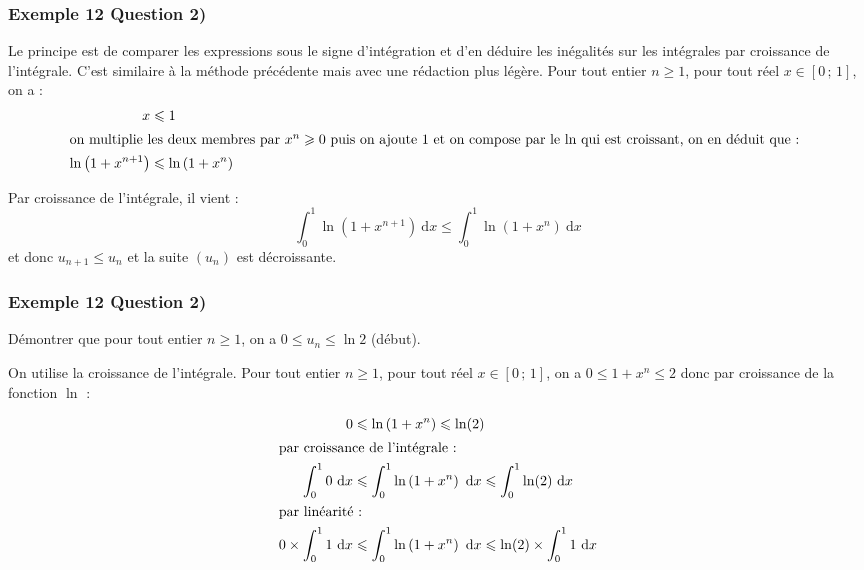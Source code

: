\documentclass[11pt, hyperref={urlcolor=red,%
            linkcolor=blue, %
            colorlinks=true}]{beamer}
\newcommand{\Interff}[2]{\left[#1\, ;\, #2\right]}
\newcommand{\suite}[1]{\ensuremath{\left(#1_{n}\right)}}
\newcommand{\dx}{\ensuremath{\text{d}x}}		%
\newcommand{\integralex}[3]{\int_{#1}^{#2} #3 \ \dx}
\begin{document}
\begin{frame}
\frametitle{Exemple  12 Question 2)}

Le principe est de comparer les expressions sous le signe d'intégration et d'en déduire les inégalités sur les intégrales par croissance de l'intégrale. C'est similaire à la méthode précédente mais avec une rédaction plus légère. Pour tout entier $n \geqslant 1$, pour tout réel $x \in \Interff{0}{1}$,  on a :
\pause \begin{align*}
x & \leqslant 1 \\
\intertext{on multiplie les deux membres par $x^{n}  \geqslant 0$ puis   on ajoute $1$ et on compose par le $\ln$ qui est croissant, on en déduit que :
}
\ln\left(1+x^{n+1}\right) &\leqslant \ln\left(1+x^{n}\right)
\end{align*}

Par croissance de l'intégrale, il vient :
$$\integralex{0}{1}{\ln\left(1+x^{n+1}\right)} \leqslant \integralex{0}{1}{\ln\left(1+x^{n}\right)}$$
et donc $u_{n+1}  \leqslant u_{n}$  et  la suite $\suite{u}$ est décroissante.




\end{frame}





\begin{frame}
\frametitle{Exemple  12 Question 2)}
Démontrer que pour tout entier $n \geqslant 1$, on a $0 \leqslant u_{n} \leqslant \ln 2$ (début).

On utilise la croissance de l'intégrale. Pour tout entier $n \geqslant 1$, pour tout réel $x \in \Interff{0}{1}$,  on a $0 \leqslant 1+x^{n}  \leqslant 2$ donc par croissance de la fonction $\ln$ :

\pause \begin{align*}
0 & \leqslant \ln\left(1+x^{n}\right) \leqslant \ln(2) \\
\intertext{par croissance de l'intégrale : }
 \integralex{0}{1}{0} & \leqslant \integralex{0}{1}{\ln\left(1+x^{n}\right)}  \leqslant \integralex{0}{1}{\ln(2)} \\
\intertext{par linéarité : }
 0 \times \integralex{0}{1}{1} & \leqslant \integralex{0}{1}{\ln\left(1+x^{n}\right)}  \leqslant \ln(2) \times \integralex{0}{1}{1} \\
\end{align*}





\end{frame}
\end{document}
